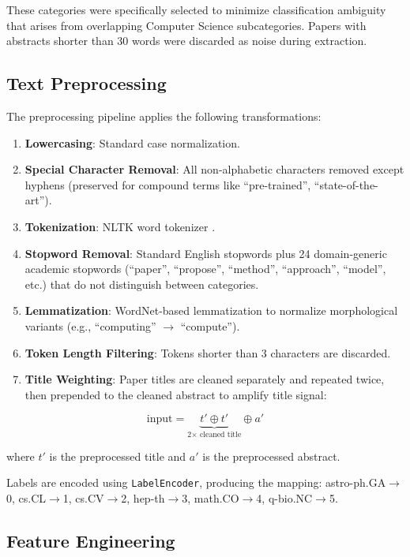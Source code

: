 \documentclass[conference]{IEEEtran}
\begin{document}
These categories were specifically selected to minimize classification ambiguity that arises from overlapping Computer Science subcategories. Papers with abstracts shorter than 30 words were discarded as noise during extraction.

\subsection{Text Preprocessing}

The preprocessing pipeline applies the following transformations:

\begin{enumerate}
    \item \textbf{Lowercasing}: Standard case normalization.
    \item \textbf{Special Character Removal}: All non-alphabetic characters removed except hyphens (preserved for compound terms like ``pre-trained'', ``state-of-the-art'').
    \item \textbf{Tokenization}: NLTK word tokenizer \cite{nltk}.
    \item \textbf{Stopword Removal}: Standard English stopwords plus 24 domain-generic academic stopwords (``paper'', ``propose'', ``method'', ``approach'', ``model'', etc.) that do not distinguish between categories.
    \item \textbf{Lemmatization}: WordNet-based lemmatization to normalize morphological variants (e.g., ``computing'' $\rightarrow$ ``compute'').
    \item \textbf{Token Length Filtering}: Tokens shorter than 3 characters are discarded.
    \item \textbf{Title Weighting}: Paper titles are cleaned separately and repeated twice, then prepended to the cleaned abstract to amplify title signal:
\end{enumerate}

\begin{equation}
\text{input} = \underbrace{t' \oplus t'}_{\text{2$\times$ cleaned title}} \oplus a'
\label{eq:title_weight}
\end{equation}

where $t'$ is the preprocessed title and $a'$ is the preprocessed abstract.

Labels are encoded using \texttt{LabelEncoder}, producing the mapping: astro-ph.GA$\rightarrow$0, cs.CL$\rightarrow$1, cs.CV$\rightarrow$2, hep-th$\rightarrow$3, math.CO$\rightarrow$4, q-bio.NC$\rightarrow$5.

\subsection{Feature Engineering}
\end{document}
